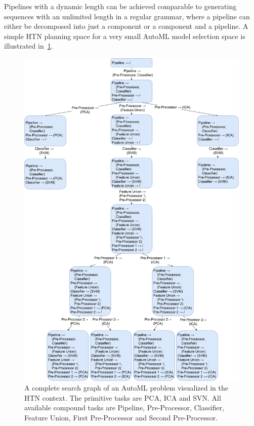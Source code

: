 Pipelines with a dynamic length can be achieved comparable to generating sequences with an unlimited length in a regular grammar, where a pipeline can either be decomposed into just a component or a component and a pipeline.
A simple HTN planning space for a very small AutoML model selection space is illustrated in~\ref{fig:appraoch:htn-automl}.
\begin{figure}[ht!]
    \centering
    \includegraphics[width=\textwidth]{gfx/Figures/Approach/HTNAutoML.pdf}
    \caption{A complete search graph of an AutoML problem visualized in the HTN context.
    The primitive tasks are PCA, ICA and SVN.
    All available compound tasks are Pipeline, Pre-Processor, Classifier, Feature Union, First Pre-Processor and Second Pre-Processor.}
    \label{fig:appraoch:htn-automl}
\end{figure}

